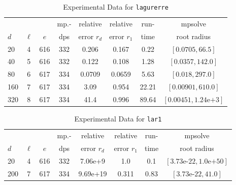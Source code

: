 \documentclass[runningheads]{llncs}
\begin{document}
\begin{table}
\caption{Experimental Data for \texttt{lagurerre}} %
\label{tab:lagurerre}
\vskip -0.15in
\begin{center}
\begin{small}
\begin{sc}
\begin{tabular}{lccccccc}
\toprule
&  &  & mp.-& relative  & relative & run- & mpsolve \\
$d$& $\ell$& $e$ & dps&error $r_d$       & error $r_1$ &time& root radius\\
\midrule
 20 & 4 & 616 & 332 & 0.206 & 0.167 & 0.22 & $[0.0705, 66.5]$\\
 40 & 5 & 616 & 332 & 0.122 & 0.108 & 1.28 & $[0.0357, 142.0]$\\
 80 & 6 & 617 & 334 & 0.0709 & 0.0659 & 5.63 & $[0.018, 297.0]$\\
 160 & 7 & 617 & 334 & 3.09 & 0.954 & 22.21 & $[0.00901, 610.0]$\\
 320 & 8 & 617 & 334 & 41.4 & 0.996 & 89.64 & $[0.00451, 1.24\text{e+}3]$\\
\bottomrule
\end{tabular}
\end{sc}
\end{small}
\end{center}
\vskip 0.05in
\end{table}

\begin{table}
\caption{Experimental Data for \texttt{lar1}} %
\label{tab:lar1}
\vskip -0.15in
\begin{center}
\begin{small}
\begin{sc}
\begin{tabular}{lccccccc}
\toprule
&  &  & mp.-& relative  & relative & run- & mpsolve \\
$d$& $\ell$& $e$ & dps&error $r_d$       & error $r_1$ &time& root radius\\
\midrule
 20 & 4 & 616 & 332 & 7.06e+9 & 1.0 & 0.1 & $[3.73\text{e-}22, 1.0\text{e+}50]$\\
 200 & 7 & 617 & 334 & 9.69e+19 & 0.311 & 0.83 & $[3.73\text{e-}22, 41.0]$\\
\bottomrule
\end{tabular}
\end{sc}
\end{small}
\end{center}
\vskip 0.05in
\end{table}
\end{document}

